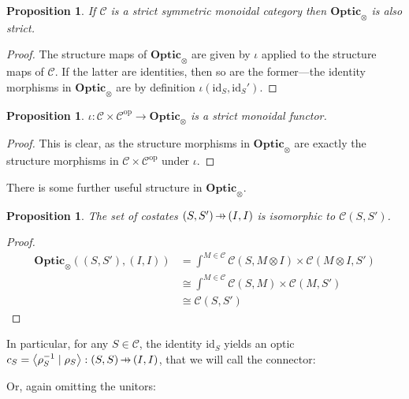 \documentclass[11pt,letterpaper]{article}
\theoremstyle{plain}
\newtheorem{proposition}[theorem]{Proposition}
\theoremstyle{definition}
\newcommand{\C}{\mathscr{C}}
\newcommand{\Optic}{\mathbf{Optic}}
\newcommand{\id}{\mathrm{id}}
\newcommand{\op}{\mathrm{op}}
\newcommand{\rep}[2]{{\ensuremath \left\langle #1 \mid #2 \right\rangle}}
\newcommand{\hto}{\ensuremath{\,\mathaccent\shortmid\rightarrow\,}}
\newcommand{\todo}[1]{\textcolor{red}{\small #1}}
\begin{document}
\begin{proposition}
  If $\C$ is a strict symmetric monoidal category then $\Optic_\otimes$ is also strict.
\end{proposition}
\begin{proof}
  The structure maps of $\Optic_\otimes$ are given by $\iota$ applied to the structure maps of $\C$. If the latter are identities, then so are the former---the identity morphisms in $\Optic_\otimes$ are by definition $\iota(\id_S, \id_S')$.
\end{proof}

\begin{proposition}
  $\iota : \C \times \C^\op \to \Optic_\otimes$ is a strict monoidal functor.
\end{proposition}
\begin{proof}
  This is clear, as the structure morphisms in $\Optic_\otimes$ are exactly the structure morphisms in $\C \times \C^\op$ under $\iota$.
\end{proof}


There is some further useful structure in $\Optic_\otimes$.
\begin{proposition}\label{prop:costates}
  The set of costates $(S, S') \hto (I, I)$ is isomorphic to $\C(S, S')$.
\end{proposition}
\begin{proof}
  \begin{align*}
    \Optic_\otimes((S, S'), (I, I))
    &= \int^{M \in \C} \C(S, M \otimes I) \times \C(M \otimes I, S') \\
    &\cong \int^{M \in \C} \C(S, M) \times \C(M, S') \\
    &\cong \C(S, S')
  \end{align*}
\end{proof}


In particular, for any $S \in \C$, the identity $\id_S$ yields an optic $c_S = \rep{\rho_S^{-1}}{\rho_S} : (S, S) \hto (I, I)$, that we will call the connector:
\begin{center}
  
\end{center}
Or, again omitting the unitors:
\begin{center}
  
\end{center}
\end{document}
